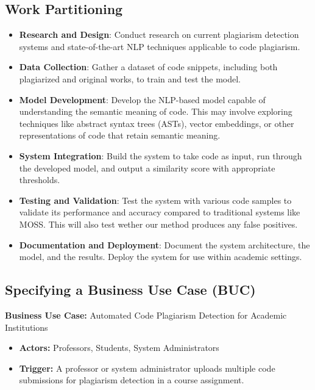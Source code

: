 \documentclass[12pt]{article}
\begin{document}
\subsection{Work Partitioning}
\begin{itemize}
  \item \textbf{Research and Design}: Conduct research on current plagiarism detection systems and state-of-the-art NLP techniques applicable to code plagiarism.
  
  \item \textbf{Data Collection}: Gather a dataset of code snippets, including both plagiarized and original works, to train and test the model.
  
  \item \textbf{Model Development}: Develop the NLP-based model capable of understanding the semantic meaning of code. This may involve exploring techniques like abstract syntax trees (ASTs), vector embeddings, or other representations of code that retain semantic meaning.
  
  \item \textbf{System Integration}: Build the system to take code as input, run through the developed model, and output a similarity score with appropriate thresholds.
  
  \item \textbf{Testing and Validation}: Test the system with various code samples to validate its performance and accuracy compared to traditional systems like MOSS. This will also test wether our method produces any false positives.
  
  \item \textbf{Documentation and Deployment}: Document the system architecture, the model, and the results. Deploy the system for use within academic settings.
\end{itemize}
\subsection{Specifying a Business Use Case (BUC)}

\textbf{Business Use Case:} Automated Code Plagiarism Detection for Academic Institutions

\begin{itemize}
    \item \textbf{Actors:} Professors, Students, System Administrators
    \item \textbf{Trigger:} A professor or system administrator uploads multiple code submissions for plagiarism detection in a course assignment.
\end{itemize}
\end{document}
